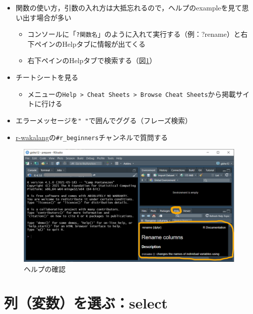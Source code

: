 \documentclass[
  xelatex,ja=standard, b5paper]{bxjsbook}
\providecommand{\tightlist}{%
  \setlength{\itemsep}{0pt}\setlength{\parskip}{0pt}}
\begin{document}
\begin{itemize}
\tightlist
\item
  関数の使い方，引数の入れ方は大抵忘れるので，ヘルプのexampleを見て思い出す場合が多い

  \begin{itemize}
  \tightlist
  \item
    コンソールに「\texttt{?関数名}」のように入れて実行する（例：?rename）と右下ペインのHelpタブに情報が出てくる
  \item
    右下ペインのHelpタブで検索する（図\ref{fig:help}）
  \end{itemize}
\item
  チートシートを見る

  \begin{itemize}
  \tightlist
  \item
    メニューの\texttt{Help\ \textgreater{}\ Cheat\ Sheets\ \textgreater{}\ Browse\ Cheat\ Sheets}から掲載サイトに行ける
  \end{itemize}
\item
  エラーメッセージを\texttt{"\ "}で囲んでググる（フレーズ検索）
\item
  \href{https://github.com/tokyor/r-wakalang}{r-wakalang}の\texttt{\#r\_beginners}チャンネルで質問する
\end{itemize}

\begin{figure}

{\centering \includegraphics[width=0.8\linewidth]{images/help} 

}

\caption{ヘルプの確認}\label{fig:help}
\end{figure}

\hypertarget{select}{%
\chapter{列（変数）を選ぶ：select}\label{select}}
\end{document}
